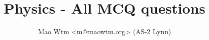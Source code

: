 \documentclass[a4paper,oneside]{book}
\author{Mao Wtm <m@maowtm.org> (AS-2 Lynn)}
\title{Physics - All MCQ questions}
\date{}
\begin{document}
\frontmatter
\maketitle
\tableofcontents
\mainmatter
{}

\newcommand\paper[1]{
  \chapter{#1}
}
\newcommand\duplicateskipped[3]{
  \vspace{0.5em} \centerline{Question #1 \textit{( #2 )} skipped since it has \hyperref[#3]{appeared before} on page \pageref{#3}.} \vspace{0.5em}
}
\newcommand\labelq[1]{
  \refstepcounter{question}
  \label{#1}
}



\backmatter
\end{document}

